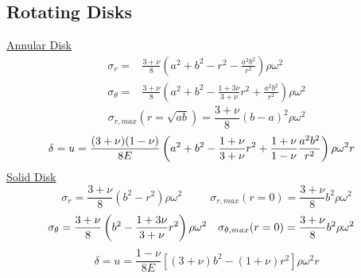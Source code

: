 \documentclass[twocolumn, 12pt]{article}    %
\begin{document}
\subsection*{Rotating Disks}
\underline{Annular Disk}\\
\begin{align*}
    \sigma_r =& \frac{3+\nu}{8} \left( a^2 + b^2 - r^2 - \frac{a^2b^2}{r^2} \right) \rho \omega^2\\
    \sigma_\theta =& \frac{3+\nu}{8} \left(a^2 + b^2 - \frac{1+3\nu}{3+\nu } r^2 +\frac{a^2b^2}{r^2} \right) \rho \omega^2
\end{align*}
\begin{equation*}
    \sigma_{r,max}(r=\sqrt{ab}) = \frac{3+\nu}{8} (b-a)^2\rho\omega^2
\end{equation*}
\begin{equation*}
    \hspace{-10pt} \delta=u = \frac{(3+\nu) (1-\nu)}{8E} \left(a^2 +b^2 - \frac{1+\nu}{3+\nu}r^2 +\frac{1+\nu}{1-\nu} \frac{a^2b^2}{r^2} \right) \rho\omega^2r
\end{equation*}
\underline{Solid Disk}\\
\begin{equation*}
    \sigma_r = \frac{3+\nu}{8} (b^2 - r^2) \rho\omega^2 \hspace{30pt}  \sigma_{r,max}(r=0) = \frac{3+\nu}{8} b^2\rho\omega^2
\end{equation*}
\begin{equation*}
    \hspace{-10pt} \sigma_\theta = \frac{3+\nu}{8} \left(b^2 - \frac{1+3\nu}{3+\nu} r^2 \right)\rho \omega^2 \hspace{10pt} \sigma_{\theta,max}(r=0) = \frac{3+\nu}{8} b^2\rho\omega^2
\end{equation*}
\begin{equation*}
    \delta= u = \frac{1-\nu}{8E} [(3+\nu)b^2 -(1+\nu) r^2] \rho\omega^2r
\end{equation*}
\end{document}
